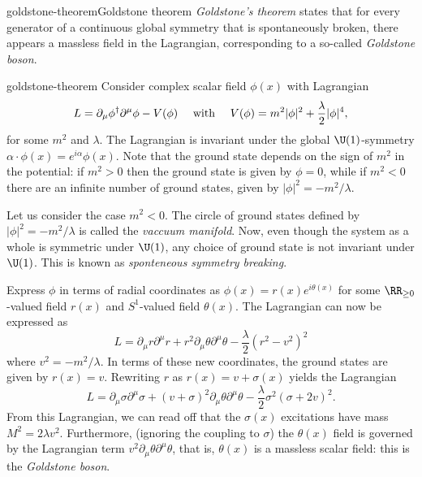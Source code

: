\begin{topic}{goldstone-theorem}{Goldstone theorem}
    \emph{Goldstone's theorem} states that for every generator of a continuous global symmetry that is spontaneously broken, there appears a massless field in the Lagrangian, corresponding to a so-called \textit{Goldstone boson}.
\end{topic}

\begin{example}{goldstone-theorem}
    Consider complex scalar field $\phi(x)$ with Lagrangian
    \[ L = \partial_\mu \phi^\dagger \partial^\mu \phi - V(\phi) \quad \textup{ with } \quad V(\phi) = m^2 |\phi|^2 + \frac{\lambda}{2} |\phi|^4 , \]
    for some $m^2$ and $\lambda$. The Lagrangian is invariant under the global $\U(1)$-symmetry $\alpha \cdot \phi(x) = e^{i \alpha} \phi(x)$. Note that the ground state depends on the sign of $m^2$ in the potential: if $m^2 > 0$ then the ground state is given by $\phi = 0$, while if $m^2 < 0$ there are an infinite number of ground states, given by $|\phi|^2 = - m^2 / \lambda$.

    Let us consider the case $m^2 < 0$. The circle of ground states defined by $|\phi|^2 = -m^2 / \lambda$ is called the \textit{vaccuum manifold}. Now, even though the system as a whole is symmetric under $\U(1)$, any choice of ground state is not invariant under $\U(1)$.
    This is known as \textit{sponteneous symmetry breaking}.

    Express $\phi$ in terms of radial coordinates as $\phi(x) = r(x) e^{i \theta(x)}$ for some $\RR_{\ge 0}$-valued field $r(x)$ and $S^1$-valued field $\theta(x)$. The Lagrangian can now be expressed as
    \[ L = \partial_\mu r \partial^\mu r + r^2 \partial_\mu \theta \partial^\mu \theta - \frac{\lambda}{2} (r^2 - v^2)^2 \]
    where $v^2 = - m^2 / \lambda$. In terms of these new coordinates, the ground states are given by $r(x) = v$. Rewriting $r$ as $r(x) = v + \sigma(x)$ yields the Lagrangian
    \[ L = \partial_\mu \sigma \partial^\mu \sigma + (v + \sigma)^2 \partial_\mu \theta \partial^\mu \theta - \frac{\lambda}{2} \sigma^2 (\sigma + 2 v)^2 . \]
    From this Lagrangian, we can read off that the $\sigma(x)$ excitations have mass $M^2 = 2 \lambda v^2$. Furthermore, (ignoring the coupling to $\sigma$) the $\theta(x)$ field is governed by the Lagrangian term $v^2 \partial_\mu \theta \partial^\mu \theta$, that is, $\theta(x)$ is a massless scalar field: this is the \textit{Goldstone boson}.
\end{example}
